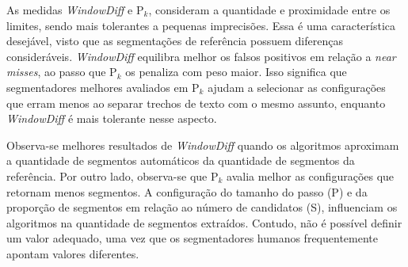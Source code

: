 As medidas \textit{WindowDiff} e P$_k$, consideram a quantidade e proximidade entre os limites, sendo mais tolerantes a pequenas imprecisões. Essa é uma característica desejável, visto que as segmentações de referência possuem diferenças consideráveis. 
%
\textit{WindowDiff} equilibra melhor os falsos positivos em relação a \textit{near misses}, ao passo que P$_k$ os penaliza com peso maior. Isso significa que segmentadores melhores avaliados em P$_k$ ajudam a selecionar as configurações que erram menos ao separar trechos de texto com o mesmo assunto, enquanto \textit{WindowDiff} é mais tolerante nesse aspecto.

Observa-se melhores resultados de \textit{WindowDiff} quando os algoritmos aproximam a quantidade de segmentos automáticos da quantidade de segmentos da referência. %
Por outro lado, observa-se que P$_k$ avalia melhor as configurações que retornam menos segmentos. A configuração do tamanho do passo (P) e da proporção de segmentos em relação ao número de candidatos (S), influenciam os algoritmos na quantidade de segmentos extraídos. Contudo, não é possível definir um valor adequado, uma vez que os segmentadores humanos frequentemente apontam valores diferentes.











